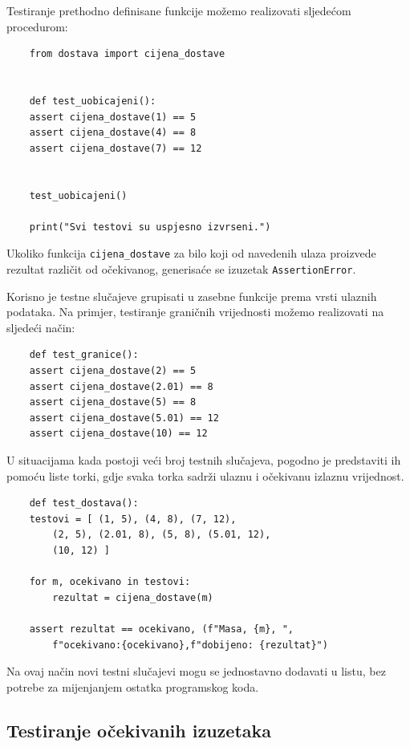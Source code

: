 Testiranje prethodno definisane funkcije možemo 
realizovati sljedećom procedurom:

\begin{verbatim}
	from dostava import cijena_dostave
	
	
	def test_uobicajeni():
	assert cijena_dostave(1) == 5
	assert cijena_dostave(4) == 8
	assert cijena_dostave(7) == 12
	
	
	test_uobicajeni()
	
	print("Svi testovi su uspjesno izvrseni.")
\end{verbatim}

Ukoliko funkcija \texttt{cijena\_dostave} za bilo koji 
od navedenih ulaza proizvede rezultat različit od 
očekivanog, generisaće se izuzetak 
\texttt{AssertionError}.

Korisno je testne slučajeve grupisati u zasebne 
funkcije prema vrsti ulaznih podataka. Na primjer, 
testiranje graničnih vrijednosti možemo realizovati 
na sljedeći način:

\begin{verbatim}
	def test_granice():
	assert cijena_dostave(2) == 5
	assert cijena_dostave(2.01) == 8
	assert cijena_dostave(5) == 8
	assert cijena_dostave(5.01) == 12
	assert cijena_dostave(10) == 12
\end{verbatim}

U situacijama kada postoji veći broj testnih slučajeva, 
pogodno je predstaviti ih pomoću liste torki, gdje 
svaka torka sadrži ulaznu i očekivanu izlaznu vrijednost.

\begin{verbatim}
	def test_dostava():
	testovi = [ (1, 5), (4, 8), (7, 12),
	    (2, 5), (2.01, 8), (5, 8), (5.01, 12),
	    (10, 12) ]
	
	for m, ocekivano in testovi:
	    rezultat = cijena_dostave(m)
	
	assert rezultat == ocekivano, (f"Masa, {m}, ",
	    f"ocekivano:{ocekivano},f"dobijeno: {rezultat}")
\end{verbatim}

Na ovaj način novi testni slučajevi mogu se jednostavno 
dodavati u listu, bez potrebe za mijenjanjem ostatka 
programskog koda.


\subsection{Testiranje očekivanih izuzetaka}

